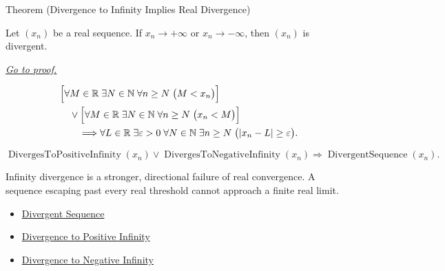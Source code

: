 
\begin{theorembox}{Theorem (Divergence to Infinity Implies Real Divergence)}
\begin{theorem}
\label{thm:divergence-to-infinity-implies-real-divergence}
Let $(x_n)$ be a real sequence. If $x_n\to+\infty$ or $x_n\to-\infty$,
then $(x_n)$ is divergent.

\smallskip
\noindent
\hyperref[prf:divergence-to-infinity-implies-real-divergence]{\textit{Go to proof.}}
\end{theorem}
\end{theorembox}

\begin{remark*}
\[
\begin{aligned}
&\Bigl[
  \forall M\in\mathbb{R}\;\exists N\in\mathbb{N}\;\forall n\ge N
  \;\bigl(M<x_n\bigr)
\Bigr]\\
&\quad\lor
\Bigl[
  \forall M\in\mathbb{R}\;\exists N\in\mathbb{N}\;\forall n\ge N
  \;\bigl(x_n<M\bigr)
\Bigr]\\
&\qquad\Longrightarrow
\forall L\in\mathbb{R}\;\exists \varepsilon>0\;\forall N\in\mathbb{N}
\;\exists n\ge N\;\bigl(|x_n-L|\ge\varepsilon\bigr).
\end{aligned}
\]
\end{remark*}

\begin{remark*}
\[
\operatorname{DivergesToPositiveInfinity}(x_n)
\lor
\operatorname{DivergesToNegativeInfinity}(x_n)
\Longrightarrow
\operatorname{DivergentSequence}(x_n).
\]
\end{remark*}

\begin{remark*}[Interpretation]
Infinity divergence is a stronger, directional failure of real convergence.
A sequence escaping past every real threshold cannot approach a finite real
limit.
\end{remark*}

\begin{dependencies}
\begin{itemize}
  \item \hyperref[def:divergent-sequence]{Divergent Sequence}
  \item \hyperref[def:diverges-to-positive-infinity]{Divergence to Positive Infinity}
  \item \hyperref[def:diverges-to-negative-infinity]{Divergence to Negative Infinity}
\end{itemize}
\end{dependencies}

